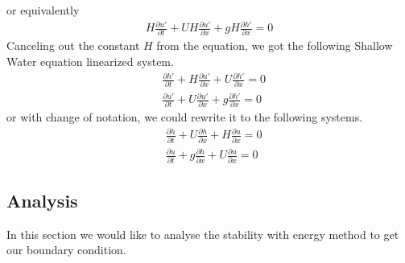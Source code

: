 \documentclass{article}
\theoremstyle{definition}
\begin{document}
    or equivalently
    \begin{align}
        H \frac{\partial u'}{\partial t} + UH \frac{\partial u'}{\partial x}  + gH \frac{\partial h'}{\partial x} =0
    \end{align}
    Canceling out the constant $H$ from the equation, we got the following Shallow Water equation linearized system. 
    \begin{align}
        &\frac{\partial h'}{\partial t} + H \frac{\partial u'}{\partial x} + U \frac{\partial h'}{\partial x} =0 \\
        &\frac{\partial u'}{\partial t} + U \frac{\partial u'}{\partial x}  + g \frac{\partial h'}{\partial x} =0
    \end{align}
    or with change of notation, we could rewrite it to the following systems. 
    \begin{align}
        \label{swe1}
        &\frac{\partial h}{\partial t}  + U \frac{\partial h}{\partial x}+ H \frac{\partial u}{\partial x} =0 \\
        \label{swe2}
        &\frac{\partial u}{\partial t} + g \frac{\partial h}{\partial x} + U \frac{\partial u}{\partial x}  =0
    \end{align}
\subsection{Analysis}
    In this section we would like to analyse the stability with energy method
    to get our boundary condition. 
\end{document}
